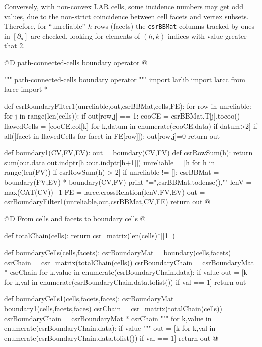\documentclass[11pt,oneside]{article}	%
\begin{document}
Conversely, with non-convex LAR cells, some incidence numbers may get odd values, due to the non-strict coincidence between cell facets and vertex subsets.
Therefore, for ``unreliable'' $h$ rows (facets) the \texttt{csrBBMat} columns tracked by ones in $[\partial_d]$ are checked, looking for elements of $(h,k)$ indices with value greater that 2.

@D path-connected-cells boundary operator
@{""" path-connected-cells boundary operator """
import larlib
import larcc
from larcc import *

def csrBoundaryFilter1(unreliable,out,csrBBMat,cells,FE):
    for row in unreliable:
        for j in range(len(cells)):
            if out[row,j] == 1:
                cooCE = csrBBMat.T[j].tocoo()
                flawedCells = [cooCE.col[k] for k,datum in enumerate(cooCE.data)
                    if datum>2]
                if all([facet in flawedCells  for facet in FE[row]]):
                    out[row,j]=0
    return out

def boundary1(CV,FV,EV):
    out = boundary(CV,FV)
    def csrRowSum(h): 
        return sum(out.data[out.indptr[h]:out.indptr[h+1]])    
    unreliable = [h for h in range(len(FV)) if csrRowSum(h) > 2]
    if unreliable != []:
        csrBBMat = boundary(FV,EV) * boundary(CV,FV)
        print "\ncsrBBMat =",csrBBMat.todense(),"\n"
        lenV = max(CAT(CV))+1
        FE = larcc.crossRelation(lenV,FV,EV)
        out = csrBoundaryFilter1(unreliable,out,csrBBMat,CV,FE)
    return out
@}



@D From cells and facets to boundary cells
@{def totalChain(cells):
    return csr_matrix(len(cells)*[[1]])

def boundaryCells(cells,facets):
    csrBoundaryMat = boundary(cells,facets)
    csrChain = csr_matrix(totalChain(cells))
    csrBoundaryChain = csrBoundaryMat * csrChain
    for k,value in enumerate(csrBoundaryChain.data):
        if value %
    out = [k for k,val in enumerate(csrBoundaryChain.data.tolist()) if val == 1]
    return out

def boundaryCells1(cells,facets,faces):
    csrBoundaryMat = boundary1(cells,facets,faces)
    csrChain = csr_matrix(totalChain(cells))
    csrBoundaryChain = csrBoundaryMat * csrChain
    """
    for k,value in enumerate(csrBoundaryChain.data):
        if value %
    """
    out = [k for k,val in enumerate(csrBoundaryChain.data.tolist()) if val == 1]
    return out
@}
\end{document}
